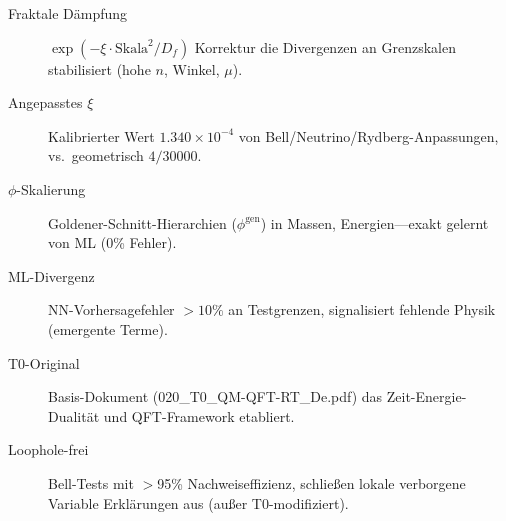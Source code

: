 	\begin{description}
		\item[Fraktale Dämpfung] $\exp(-\xi \cdot \text{Skala}^2/D_f)$ Korrektur die Divergenzen an Grenzskalen stabilisiert (hohe $n$, Winkel, $\mu$).
		\item[Angepasstes $\xi$] Kalibrierter Wert $1.340\times10^{-4}$ von Bell/Neutrino/Rydberg-Anpassungen, vs.~geometrisch $4/30000$.
		\item[$\phi$-Skalierung] Goldener-Schnitt-Hierarchien ($\phi^{\text{gen}}$) in Massen, Energien—exakt gelernt von ML (0\% Fehler).
		\item[ML-Divergenz] NN-Vorhersagefehler $>10\%$ an Testgrenzen, signalisiert fehlende Physik (emergente Terme).
		\item[T0-Original] Basis-Dokument (020\_T0\_QM-QFT-RT\_De.pdf) das Zeit-Energie-Dualität und QFT-Framework etabliert.
		\item[Loophole-frei] Bell-Tests mit $>$95\% Nachweiseffizienz, schließen lokale verborgene Variable Erklärungen aus (außer T0-modifiziert).
	\end{description}
	
